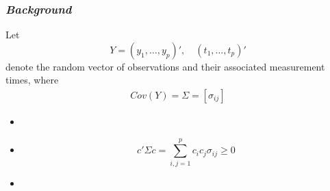 
{ %
\begin{frame}[c]%
 \titlepage
\end{frame}
}

\begin{frame}
\frametitle{\textit{Background}}
Let 
\[
Y = \left(y_1,\dots, y_p\right)', \quad \left(t_1,\dots, t_p\right)'
\]
denote the random vector of observations and their associated measurement times, where 
\begin{align*}
 Cov\left(Y\right) = \Sigma = \left[ \sigma_{ij} \right] 
\end{align*}

\begin{itemize}
\item {} \pause
\item {}
\begin{equation*}
 		c'\Sigma c = \sum_{i,j = 1}^p c_i c_j \sigma_{ij} \ge 0
\end{equation*} \pause
\item {} 
\end{itemize}
\end{frame}



%
%



